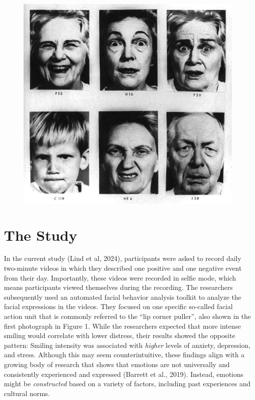 \documentclass[authordate, empirical]{jote-new-article}
\begin{document}
	\begin{figure}
		\includegraphics[width=\linewidth]{media/image1.jpeg}

		\caption{}

		\label{fig:rId6}


	\end{figure}







	\section{The Study }



	In the current study (Lind et al, 2024), participants were asked to record daily two-minute videos in which they described one positive and one negative event from their day. Importantly, these videos were recorded in selfie mode, which means participants viewed themselves during the recording. The researchers subsequently used an automated facial behavior analysis toolkit to analyze the facial expressions in the videos. They focused on one specific so-called facial action unit that is commonly referred to the “lip corner puller”, also shown in the first photograph in Figure 1. While the researchers expected that more intense smiling would correlate with lower distress, their results showed the opposite pattern: Smiling intensity was associated with \emph{higher} levels of anxiety, depression, and stress. Although this may seem counterintuitive, these findings align with a growing body of research that shows that emotions are not universally and consistently experienced and expressed (Barrett et al., 2019). Instead, emotions might be \emph{constructed} based on a variety of factors, including past experiences and cultural norms.
\end{document}
